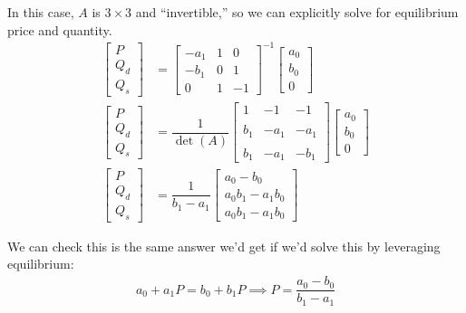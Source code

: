 \documentclass{article}
\begin{document}
In this case, $A$ is $3 \times 3$ and ``invertible,'' so we can explicitly solve for equilibrium price and quantity.
\begin{align*}
  \begin{bmatrix}
    P
    \\
    Q_d
    \\
    Q_s
  \end{bmatrix}
  &
  =
  \begin{bmatrix}
    - a_1 & 1 & 0
    \\
    - b_1 & 0 & 1
    \\
    0 & 1 & -1
  \end{bmatrix}^{-1}
  \begin{bmatrix}
    a_0
    \\
    b_0
    \\
    0
  \end{bmatrix}
  \\
  \begin{bmatrix}
    P
    \\
    Q_d
    \\
    Q_s
  \end{bmatrix}
  &
  =
  \dfrac{1}{\det(A)}
  \begin{bmatrix}
    1 & -1 & -1 \\
    \\
    b_1 & -a_1 & -a_1 \\
    \\
    b_1 & -a_1 & -b_1
  \end{bmatrix}
  \begin{bmatrix}
    a_0
    \\
    b_0
    \\
    0
  \end{bmatrix}
  \\
  \begin{bmatrix}
    P
    \\
    Q_d
    \\
    Q_s
  \end{bmatrix}
  &
  =
  \dfrac{1}{b_1 - a_1}
  \begin{bmatrix}
    a_0 - b_0
    \\
    a_0 b_1 - a_1 b_0
    \\
    a_0 b_1 - a_1 b_0
  \end{bmatrix}
\end{align*}

We can check this is the same answer we'd get if we'd solve this by leveraging equilibrium:
\begin{align*}
  a_0 + a_1 P
  =
  b_0 + b_1 P
  \implies
  P = \dfrac{a_0 - b_0}{b_1 - a_1}
\end{align*}
\end{document}
